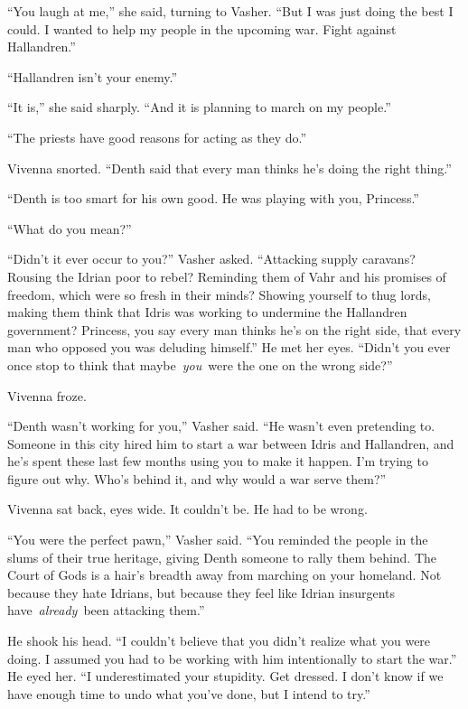 “You laugh at me,” she said, turning to Vasher. “But I was just doing the best I could. I wanted to help my people in the upcoming war. Fight against Hallandren.”

“Hallandren isn’t your enemy.”

“It is,” she said sharply. “And it is planning to march on my people.”

“The priests have good reasons for acting as they do.”

Vivenna snorted. “Denth said that every man thinks he’s doing the right thing.”

“Denth is too smart for his own good. He was playing with you, Princess.”

“What do you mean?”

“Didn’t it ever occur to you?” Vasher asked. “Attacking supply caravans? Rousing the Idrian poor to rebel? Reminding them of Vahr and his promises of freedom, which were so fresh in their minds? Showing yourself to thug lords, making them think that Idris was working to undermine the Hallandren government? Princess, you say every man thinks he’s on the right side, that every man who opposed you was deluding himself.” He met her eyes. “Didn’t you ever once stop to think that maybe~\textit{you}~were the one on the wrong side?”

Vivenna froze.

“Denth wasn’t working for you,” Vasher said. “He wasn’t even pretending to. Someone in this city hired him to start a war between Idris and Hallandren, and he’s spent these last few months using you to make it happen. I’m trying to figure out why. Who’s behind it, and why would a war serve them?”

Vivenna sat back, eyes wide. It couldn’t be. He had to be wrong.

“You were the perfect pawn,” Vasher said. “You reminded the people in the slums of their true heritage, giving Denth someone to rally them behind. The Court of Gods is a hair’s breadth away from marching on your homeland. Not because they hate Idrians, but because they feel like Idrian insurgents have~\textit{already}~been attacking them.”

He shook his head. “I couldn’t believe that you didn’t realize what you were doing. I assumed you had to be working with him intentionally to start the war.” He eyed her. “I underestimated your stupidity. Get dressed. I don’t know if we have enough time to undo what you’ve done, but I intend to try.”

\orn

